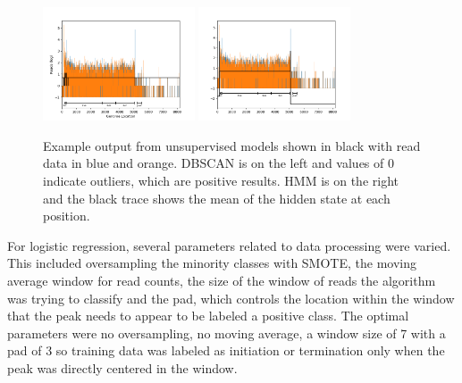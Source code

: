 \documentclass{article}
\begin{document}
\begin{figure}[H]
    \centering
    \includegraphics[width=0.4\textwidth]{0_dbscan.png}
    \includegraphics[width=0.4\textwidth]{0_hmm.png}
    \caption{Example output from unsupervised models shown in black with read data in blue and orange.  DBSCAN is on the left and values of 0 indicate outliers, which are positive results.  HMM is on the right and the black trace shows the mean of the hidden state at each position.}
    \label{fig:unsup}
\end{figure}

For logistic regression, several parameters related to data processing were varied.  This included oversampling the minority classes with SMOTE, the moving average window for read counts, the size of the window of reads the algorithm was trying to classify and the pad, which controls the location within the window that the peak needs to appear to be labeled a positive class.  The optimal parameters were no oversampling, no moving average, a window size of 7 with a pad of 3 so training data was labeled as initiation or termination only when the peak was directly centered in the window.
\end{document}
